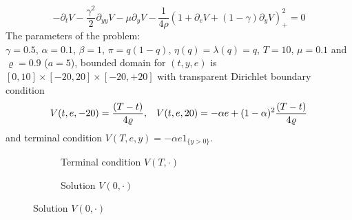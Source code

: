 \documentclass[border=10pt]{article}
\begin{document}
\[  -\partial_t V - \frac{\gamma^2}{2}\partial_{yy} V -\mu \partial_{y} V -\frac{1}{4\rho}(1+\partial_e V + (1-\gamma)\partial_y V)_+^2 = 0  \]   
The parameters of the problem:\\ 
$\gamma=0.5$, $\alpha=0.1$, $\beta=1$, $\pi=q(1-q)$, $\eta(q)=\lambda(q)=q$, $T=10$, $\mu=0.1$ and $\varrho=0.9$ ($a=5$),  bounded domain for $(t,y,e)$ is $[0,10]\times[-20, 20]\times[-20, +20]$ with transparent Dirichlet boundary condition 
\[V(t,e,-20)=\frac{(T-t)}{4\varrho},\hspace*{.3cm} V(t,e,20)=-\alpha e+(1-\alpha)^2\frac{(T-t)}{4\varrho}
\]
and terminal condition $V(T,e,y)=-\alpha e1_{\{y>0\}}$.
\begin{figure}
\begin{subfigure}[b]{0.5\textwidth}
\centering
{}
\caption{Terminal condition $V(T,\cdot)$}
\end{subfigure}
\begin{subfigure}[b]{0.5\textwidth}
\centering
{}
\caption{Solution $V(0,\cdot)$}
\end{subfigure}
\end{figure}
\end{document}
